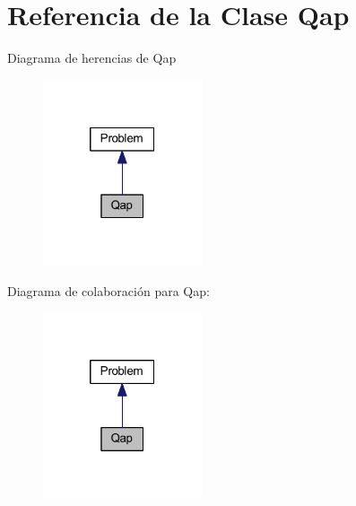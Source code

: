 \hypertarget{class_qap}{\section{Referencia de la Clase Qap}
\label{class_qap}
}


Diagrama de herencias de Qap
\nopagebreak
\begin{figure}[H]
\begin{center}
\leavevmode
\includegraphics[width=133pt]{class_qap__inherit__graph}
\end{center}
\end{figure}


Diagrama de colaboración para Qap\+:
\nopagebreak
\begin{figure}[H]
\begin{center}
\leavevmode
\includegraphics[width=133pt]{class_qap__coll__graph}
\end{center}
\end{figure}
